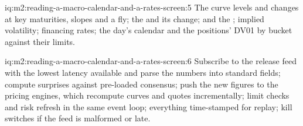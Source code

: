 \begin{solution}{iq:m2:reading-a-macro-calendar-and-a-rates-screen:5}
The curve levels and changes at key maturities, slopes and a fly; the 
and its change;  and the ; implied volatility; financing
rates; the day's calendar and the positions' DV01 by bucket against their limits.
\end{solution}

\begin{solution}{iq:m2:reading-a-macro-calendar-and-a-rates-screen:6}
Subscribe to the release feed with the lowest latency available and parse the numbers
into standard fields; compute surprises against pre-loaded consensus; push the new
figures to the pricing engines, which recompute curves and quotes incrementally; limit
checks and risk refresh in the same event loop; everything time-stamped for replay; kill
switches if the feed is malformed or late.
\end{solution}
